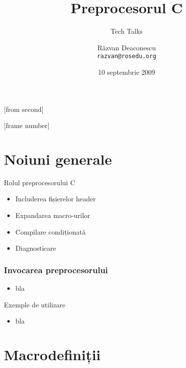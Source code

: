 \documentclass{beamer}
\title[Preprocesorul C]{Preprocesorul C}
\subtitle{Tech Talks}
\institute{ROSEdu}
\author[Răzvan]{Răzvan Deaconescu \\ \texttt{razvan@rosedu.org}}
\date{10 septembrie 2009}
\begin{document}
[from second]

[frame number]

\frame{\titlepage}

\frame{\tableofcontents}

\section{Noiuni generale}

\frame{\tableofcontents[currentsection]}

\begin{frame}{Rolul preprocesorului C}
  \begin{itemize}		%
    \item Includerea fișierelor header
    \item Expandarea macro-urilor
    \item Compilare condiționată
    \item Diagnosticare
  \end{itemize}
\end{frame}

\begin{frame}[allowframebreaks] %
  \frametitle{Invocarea preprocesorului}
  \begin{itemize}
    \item bla
  \end{itemize}
\end{frame}

\begin{frame}{Exemple de utilizare}
  \begin{itemize}
    \item bla
  \end{itemize}
\end{frame}

\section{Macrodefiniții}
\end{document}
